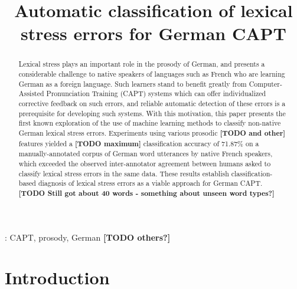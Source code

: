 \documentclass[a4paper]{article}
\title{Automatic classification of lexical stress errors for German CAPT}
\newcommand{\TODO}[1]{{\color{red}\textbf{[TODO #1]}}}
\begin{document}
  \maketitle
  \begin{abstract}
    
  	Lexical stress plays an important role in the prosody of German, and presents a considerable challenge to native speakers of languages such as French who are learning German as a foreign language. Such learners stand to benefit greatly from Computer-Assisted Pronunciation Training (CAPT) systems which can offer individualized corrective feedback on such errors, and reliable automatic detection of these errors is a prerequisite for developing such systems. With this motivation, this paper presents the first known exploration of the use of machine learning methods to classify non-native German lexical stress errors. Experiments using various prosodic \TODO{and other} features yielded a \TODO{maximum} classification accuracy of 71.87\% on a manually-annotated corpus of German word utterances by native French speakers, which exceeded the observed inter-annotator agreement between humans asked to classify lexical stress errors in the same data. These results 
  	establish classification-based diagnosis of lexical stress errors as a viable approach for German CAPT.
  	\TODO{Still got about 40 words - something about unseen word types?}
    
    
    
  \end{abstract}
  : CAPT, prosody, German \TODO{others?}


  \section{Introduction}
  
  
    
  
\end{document}

